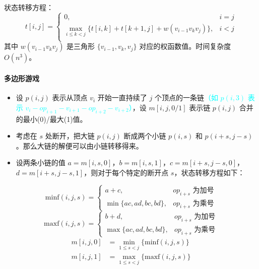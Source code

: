 \documentclass[UTF8]{ctexart}
\newcommand\Emph[1]{\textcolor{cyan!80!black}{#1}}
\begin{document}
状态转移方程：
\begin{equation*}
  t[i,j] = \begin{cases}
             0, & i=j \\
             \max\limits_{i\leqslant k <j} \{t[i,k] + t[k+1,j] + w(v_{i-1} v_k v_j)\}, & i<j \\
           \end{cases}
\end{equation*}
其中 $w(v_{i-1} v_k v_j)$ 是三角形 $\{v_{i-1},v_k,v_j\}$ 对应的权函数值。\Emph{时间复杂度 $O(n^3)$。}

\paragraph{多边形游戏} 

\begin{itemize}
  \item 设 $p(i,j)$ 表示从顶点 $v_i$ 开始一直持续了 $j$ 个顶点的一条链\textcolor{cyan}{（如 $p(i,3)$ 表示 $v_i-op_{i+1}-v_{i+1}-op_{i+2}-v_{i+2}$）}，设 $m[i,j,0/1]$ 表示链 $p(i,j)$ 合并的最小(0)/最大(1)值。
  \item 考虑在 $s$ 处断开，把大链 $p(i,j)$ 断成两个小链 $p(i,s)$ 和 $p(i+s,j-s)$。那么大链的解便可以由小链转移得来。
  \item 设两条小链的值 $a=m[i,s,0]$，$b=m[i,s,1]$，$c=m[i+s,j-s,0]$，$d=m[i+s,j-s,1]$，则对于每个特定的断开点 $s$，状态转移方程如下：
\end{itemize}
\begin{equation*}
    \mathrm{minf}(i,j,s) = \begin{cases}
                 a+c, & op_{i+s}\text{\ 为加号} \\
                 \min\{ac,ad,bc,bd\}, &op_{i+s}\text{\ 为乘号} 
               \end{cases}
\end{equation*}
\begin{equation*}
    \mathrm{maxf}(i,j,s) = \begin{cases}
                 b+d, & op_{i+s}\text{\ 为加号} \\
                 \max\{ac,ad,bc,bd\}, &op_{i+s}\text{\ 为乘号}
               \end{cases}
\end{equation*}
\begin{equation*}
\begin{aligned}
    m[i,j,0] &= \min\limits_{1\leqslant s<j} \{\mathrm{minf}(i,j,s)\} \\
    m[i,j,1] &= \max\limits_{1\leqslant s<j} \{\mathrm{maxf}(i,j,s)\}
\end{aligned}
\end{equation*}
\end{document}
